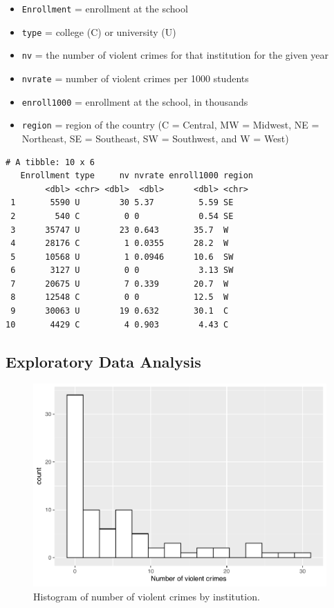 \documentclass[
]{krantz}
\providecommand{\tightlist}{%
  \setlength{\itemsep}{0pt}\setlength{\parskip}{0pt}}
\begin{document}
\begin{itemize}
\tightlist
\item
  \texttt{Enrollment} = enrollment at the school
\item
  \texttt{type} = college (C) or university (U)
\item
  \texttt{nv} = the number of violent crimes for that institution for the given year
\item
  \texttt{nvrate} = number of violent crimes per 1000 students
\item
  \texttt{enroll1000} = enrollment at the school, in thousands
\item
  \texttt{region} = region of the country (C = Central, MW = Midwest, NE = Northeast, SE = Southeast, SW = Southwest, and W = West)
\end{itemize}

\begin{verbatim}
# A tibble: 10 x 6
   Enrollment type     nv nvrate enroll1000 region
        <dbl> <chr> <dbl>  <dbl>      <dbl> <chr> 
 1       5590 U        30 5.37         5.59 SE    
 2        540 C         0 0            0.54 SE    
 3      35747 U        23 0.643       35.7  W     
 4      28176 C         1 0.0355      28.2  W     
 5      10568 U         1 0.0946      10.6  SW    
 6       3127 U         0 0            3.13 SW    
 7      20675 U         7 0.339       20.7  W     
 8      12548 C         0 0           12.5  W     
 9      30063 U        19 0.632       30.1  C     
10       4429 C         4 0.903        4.43 C     
\end{verbatim}

\hypertarget{exploratory-data-analysis}{%
\subsection{Exploratory Data Analysis}\label{exploratory-data-analysis}}

\begin{figure}

{\centering \includegraphics[width=0.6\linewidth]{bookdown-BeyondMLR_files/figure-latex/nviolent-1} 

}

\caption{Histogram of number of violent crimes by institution.}\label{fig:nviolent}
\end{figure}
\end{document}

